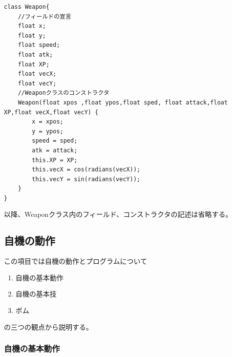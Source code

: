 \documentclass[a4paper,titlepage,11pt]{ltjsarticle}
\begin{document}
\begin{lstlisting}[caption={ソースコード\ref{Weapon}}]
	class Weapon{
    //フィールドの宣言
    float x;
    float y;
    float speed;
    float atk;
    float XP;
    float vecX;
    float vecY;
    //Weaponクラスのコンストラクタ
    Weapon(float xpos ,float ypos,float sped, float attack,float XP,float vecX,float vecY) {
        x = xpos;
        y = ypos;
        speed = sped;
        atk = attack;
        this.XP = XP;
        this.vecX = cos(radians(vecX));
        this.vecY = sin(radians(vecY));
    }
}
\end{lstlisting}
\label{Weapon}
以降、Weaponクラス内のフィールド、コンストラクタの記述は省略する。
\subsection{自機の動作}
この項目では自機の動作とプログラムについて
\begin{enumerate}
	\item 自機の基本動作
	\item 自機の基本技
	\item ボム
\end{enumerate}
の三つの観点から説明する。
\subsubsection{自機の基本動作}
\end{document}
